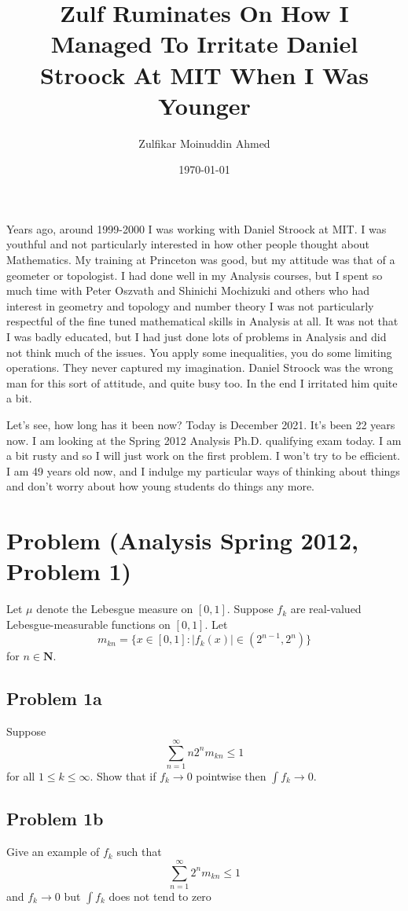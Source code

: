 \documentclass{amsart}
\title{Zulf Ruminates On How I Managed To Irritate Daniel Stroock At MIT When I Was Younger}
\author{Zulfikar Moinuddin Ahmed}
\date{\today}
\begin{document}
\maketitle

Years ago, around 1999-2000 I was working with Daniel Stroock at MIT.  I was youthful and not particularly interested in how other people thought about Mathematics.  My training at Princeton was good, but my attitude was that of a geometer or topologist.  I had done well in my Analysis courses, but I spent so much time with Peter Oszvath and Shinichi Mochizuki and others who had interest in geometry and topology and number theory I was not particularly respectful of the fine tuned mathematical skills in Analysis at all. It was not that I was badly educated, but I had just done lots of problems in Analysis and did not think much of the issues.  You apply some inequalities, you do some limiting operations.  They never captured my imagination.  Daniel Stroock was the wrong man for this sort of attitude, and quite busy too.  In the end I irritated him quite a bit.  

Let's see, how long has it been now?  Today is December 2021.  It's been 22 years now.  I am looking at the Spring 2012 Analysis Ph.D. qualifying exam today.  I am a bit rusty and so I will just work on the first problem.  I won't try to be efficient.  I am 49 years old now, and I indulge my particular ways of thinking about things and don't worry about how young students do things any more. 

\section{Problem (Analysis Spring 2012, Problem 1)}

Let $\mu$ denote the Lebesgue measure on $[0,1]$.  Suppose $f_k$ are real-valued Lebesgue-measurable functions on $[0,1]$.  
Let
\[
m_{kn} = \{ x \in [0,1]: |f_k(x)| \in (2^{n-1},2^n) \}
\]
for $n \in \mathbf{N}$.

\subsection{Problem 1a}

Suppose
\[
\sum_{n=1}^\infty n 2^n m_{kn} \le 1
\]
for all $1 \le k \le \infty$.
Show that if $f_k \rightarrow 0$ pointwise then $\int f_k \rightarrow 0$.

\subsection{Problem 1b}
Give an example of $f_k$ such that 
\[
\sum_{n=1}^\infty 2^n m_{kn} \le 1
\]
and $f_k \rightarrow 0$ but $\int f_k$ does not tend to zero
\end{document}
